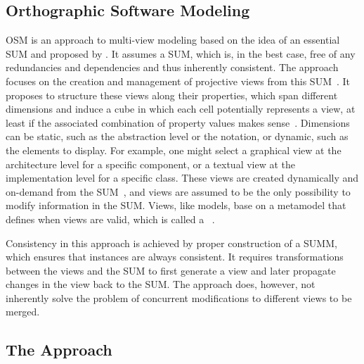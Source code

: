 \subsection{Orthographic Software Modeling}
\label{chap:foundations:multiview:osm}

\gls{OSM} is an approach to multi-view modeling based on the idea of an essential \gls{SUM} and proposed by \textcite{atkinson2010a}.
It assumes a \gls{SUM}, which is, in the best case, free of any redundancies and dependencies and thus inherently consistent.
The approach focuses on the creation and management of projective views from this \gls{SUM}~\cite[p.~211]{atkinson2010a}.
It proposes to structure these views along their properties, which span different dimensions and induce a cube in which each cell potentially represents a view, at least if the associated combination of property values makes sense~\cite[p.~212]{atkinson2010a}.
Dimensions can be static, such as the abstraction level or the notation, or dynamic, such as the elements to display.
For example, one might select a graphical view at the architecture level for a specific component, or a textual view at the implementation level for a specific class.
These views are created dynamically and on-demand from the \gls{SUM}~\cite[p.~211]{atkinson2010a}, and views are assumed to be the only possibility to modify information in the \gls{SUM}.
Views, like models, base on a metamodel that defines when views are valid, which is called a \emph{\viewtype}~\cite[p.~133]{goldschmidt2011diss}.

Consistency in this approach is achieved by proper construction of a \gls{SUMM}, which ensures that instances are always consistent.
It requires transformations between the views and the \gls{SUM} to first generate a view and later propagate changes in the view back to the \gls{SUM}.
The approach does, however, not inherently solve the problem of concurrent modifications to different views to be merged.


\subsection{The \vitruv Approach}
\label{chap:foundations:multiview:vitruv}

